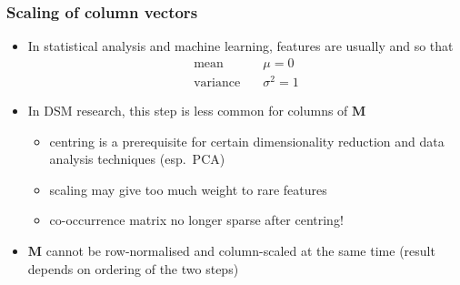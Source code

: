 \documentclass[t]{beamer} %
\begin{document}
\begin{frame}
  \frametitle{Scaling of column vectors}

  \begin{itemize}
  \item In statistical analysis and machine learning, features are
    usually  and  so that
    \begin{align*}
      \text{mean} & \quad \mu = 0 \\
      \text{variance} & \quad \sigma^2 = 1
    \end{align*}
  \item In DSM research, this step is less common for columns of $\mathbf{M}$
    \begin{itemize}
    \item centring is a prerequisite for certain dimensionality
      reduction and data analysis techniques (esp.\ PCA)
    \item scaling may give too much weight to rare features
    \item co-occurrence matrix no longer sparse after centring!
    \end{itemize}
    \pause
  \item $\mathbf{M}$ cannot be row-normalised and column-scaled at the
    same time (result depends on ordering of the two steps)
  \end{itemize}
\end{frame}
\end{document}

